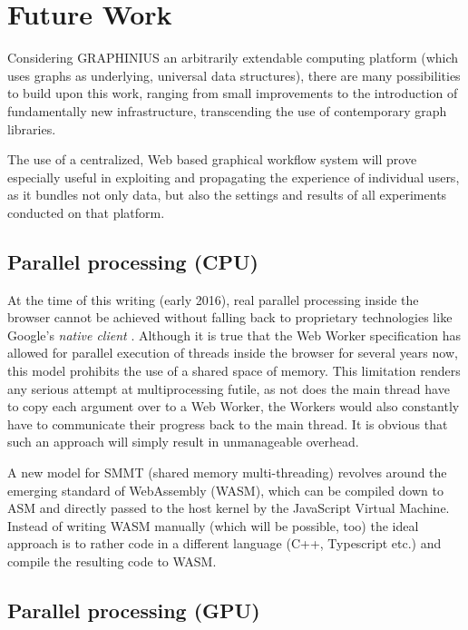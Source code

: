\chapter{Future Work}
\label{ch:future_work}

Considering GRAPHINIUS an arbitrarily extendable computing platform (which uses graphs as underlying, universal data structures), there are many possibilities to build upon this work, ranging from small improvements to the introduction of fundamentally new infrastructure, transcending the use of contemporary graph libraries. 

The use of a centralized, Web based graphical workflow system will prove especially useful in exploiting and propagating the experience of individual users, as it bundles not only data, but also the settings and results of all experiments conducted on that platform.


\section{Parallel processing (CPU)}
\label{sect:parallel_cpu}

At the time of this writing (early 2016), real parallel processing inside the browser cannot be achieved without falling back to proprietary technologies like Google's \textit{native client} \citep{yee2009native}. Although it is true that the Web Worker specification has allowed for parallel execution of threads inside the browser for several years now, this model prohibits the use of a shared space of memory. This limitation renders any serious attempt at multiprocessing futile, as not does the main thread have to copy each argument over to a Web Worker, the Workers would also constantly have to communicate their progress back to the main thread. It is obvious that such an approach will simply result in unmanageable overhead.

A new model for SMMT (shared memory multi-threading) revolves around the emerging standard of WebAssembly (WASM), which can be compiled down to ASM and directly passed to the host kernel by the JavaScript Virtual Machine. Instead of writing WASM manually (which will be possible, too) the ideal approach is to rather code in a different language (C++, Typescript etc.) and compile the resulting code to WASM.


\section{Parallel processing (GPU)}
\label{sect:parallel_gpu}

